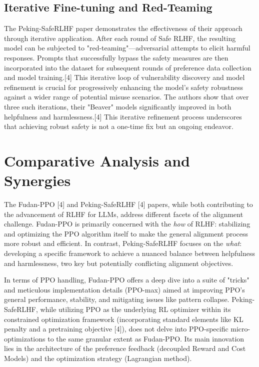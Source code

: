 \documentclass[10pt,journal,compsoc]{IEEEtran} %
\begin{document}
\subsection{Iterative Fine-tuning and Red-Teaming}
The Peking-SafeRLHF paper demonstrates the effectiveness of their approach through iterative application. After each round of Safe RLHF, the resulting model can be subjected to "red-teaming"—adversarial attempts to elicit harmful responses. Prompts that successfully bypass the safety measures are then incorporated into the dataset for subsequent rounds of preference data collection and model training.[4] This iterative loop of vulnerability discovery and model refinement is crucial for progressively enhancing the model's safety robustness against a wider range of potential misuse scenarios. The authors show that over three such iterations, their "Beaver" models significantly improved in both helpfulness and harmlessness.[4] This iterative refinement process underscores that achieving robust safety is not a one-time fix but an ongoing endeavor.

\section{Comparative Analysis and Synergies}
\label{sec:comparative}

The Fudan-PPO [4] and Peking-SafeRLHF [4] papers, while both contributing to the advancement of RLHF for LLMs, address different facets of the alignment challenge. Fudan-PPO is primarily concerned with the \textit{how} of RLHF: stabilizing and optimizing the PPO algorithm itself to make the general alignment process more robust and efficient. In contrast, Peking-SafeRLHF focuses on the \textit{what}: developing a specific framework to achieve a nuanced balance between helpfulness and harmlessness, two key but potentially conflicting alignment objectives.

In terms of PPO handling, Fudan-PPO offers a deep dive into a suite of "tricks" and meticulous implementation details (PPO-max) aimed at improving PPO's general performance, stability, and mitigating issues like pattern collapse. Peking-SafeRLHF, while utilizing PPO as the underlying RL optimizer within its constrained optimization framework (incorporating standard elements like KL penalty and a pretraining objective [4]), does not delve into PPO-specific micro-optimizations to the same granular extent as Fudan-PPO. Its main innovation lies in the architecture of the preference feedback (decoupled Reward and Cost Models) and the optimization strategy (Lagrangian method).
\end{document}
